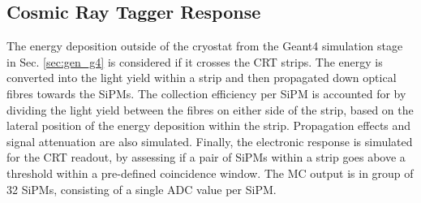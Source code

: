 %
%

\subsection{Cosmic Ray Tagger Response}

The energy deposition outside of the cryostat from the Geant4 simulation stage in Sec. \ref{sec:gen_g4} is considered if it crosses the CRT strips.
The energy is converted into the light yield within a strip and then propagated down optical fibres towards the SiPMs.
The collection efficiency per SiPM is accounted for by dividing the light yield between the fibres on either side of the strip, based on the lateral position of the energy deposition within the strip.
Propagation effects and signal attenuation are also simulated.
Finally, the electronic response is simulated for the CRT readout, by assessing if a pair of SiPMs within a strip goes above a threshold within a pre-defined coincidence window.
The MC output is in group of 32 SiPMs, consisting of a single ADC value per SiPM.

